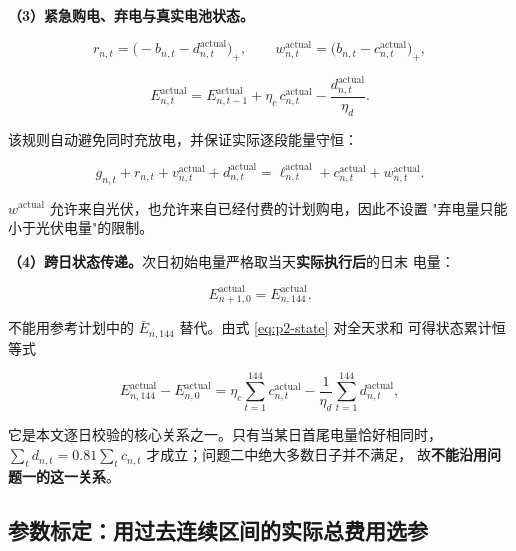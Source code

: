 \documentclass[withoutpreface,bwprint]{cumcmthesis}
\begin{document}
\textbf{（3）紧急购电、弃电与真实电池状态。}

\begin{equation}
  r_{n,t}=\bigl(-b_{n,t}-d_{n,t}^{\mathrm{actual}}\bigr)_+,
  \qquad
  w_{n,t}^{\mathrm{actual}}=\bigl(b_{n,t}-c_{n,t}^{\mathrm{actual}}\bigr)_+ ,
  \label{eq:p2-residual}
\end{equation}

\begin{equation}
  E_{n,t}^{\mathrm{actual}}
  =E_{n,t-1}^{\mathrm{actual}}
  +\eta_c\,c_{n,t}^{\mathrm{actual}}
  -\frac{d_{n,t}^{\mathrm{actual}}}{\eta_d} .
  \label{eq:p2-state}
\end{equation}

该规则自动避免同时充放电，并保证实际逐段能量守恒：

\begin{equation}
  g_{n,t}+r_{n,t}+v_{n,t}^{\mathrm{actual}}+d_{n,t}^{\mathrm{actual}}
  =\ell_{n,t}^{\mathrm{actual}}+c_{n,t}^{\mathrm{actual}}
  +w_{n,t}^{\mathrm{actual}} .
  \label{eq:p2-actual-balance}
\end{equation}

$w^{\mathrm{actual}}$ 允许来自光伏，也允许来自已经付费的计划购电，因此不设置
"弃电量只能小于光伏电量"的限制。

\textbf{（4）跨日状态传递。}次日初始电量严格取当天\textbf{实际执行后}的日末
电量：

\begin{equation}
  E_{n+1,0}^{\mathrm{actual}}=E_{n,144}^{\mathrm{actual}} .
  \label{eq:p2-carry}
\end{equation}

不能用参考计划中的 $\bar E_{n,144}$ 替代。由式 \eqref{eq:p2-state} 对全天求和
可得状态累计恒等式

\begin{equation}
  E_{n,144}^{\mathrm{actual}}-E_{n,0}^{\mathrm{actual}}
  =\eta_c\sum_{t=1}^{144}c_{n,t}^{\mathrm{actual}}
  -\frac{1}{\eta_d}\sum_{t=1}^{144}d_{n,t}^{\mathrm{actual}} ,
  \label{eq:p2-accum}
\end{equation}

它是本文逐日校验的核心关系之一。只有当某日首尾电量恰好相同时，
$\sum_t d_{n,t}=0.81\sum_t c_{n,t}$ 才成立；问题二中绝大多数日子并不满足，
故\textbf{不能沿用问题一的这一关系}。

\subsection{参数标定：用过去连续区间的实际总费用选参}
\label{sec:p2-calib}
\end{document}
